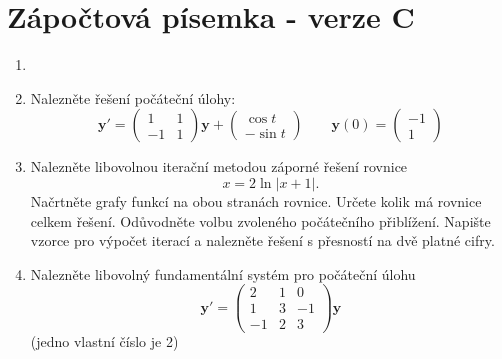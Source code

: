 \documentclass[a4paper,10pt]{article}
\def\vc#1{\mathbf{\boldsymbol{#1}}}     %
\def\abs#1{\lvert#1\rvert}
\begin{document}
\section*{Zápočtová písemka - verze C}
\begin{enumerate}
 \item 
 \item 
   Nalezněte řešení počáteční úlohy:
   \[
    \vc y'=\begin{pmatrix}
          1 & 1 \\ -1 & 1
       \end{pmatrix} \vc y
       +
       \begin{pmatrix}
         \cos t \\ -\sin t
       \end{pmatrix}
    \qquad
    \vc y(0)=\begin{pmatrix}
           -1 \\ 1
         \end{pmatrix}
   \]
\item 
    Nalezněte libovolnou iterační metodou záporné řešení rovnice
    \[
       x=2\ln\abs{x+1}.
    \]
    Načrtněte grafy funkcí na obou stranách rovnice. Určete kolik má rovnice celkem řešení.
    Odůvodněte volbu zvoleného počátečního přiblížení. Napište vzorce pro výpočet iterací
    a nalezněte řešení s přesností na dvě platné cifry.
 \item
    Nalezněte libovolný fundamentální systém pro počáteční úlohu
    \[
    \vc y'=\begin{pmatrix}
          2 & 1 & 0 \\ 
          1 & 3 & -1 \\
          -1 & 2 & 3
       \end{pmatrix} \vc y   
    \]
   (jedno vlastní číslo je 2)
\end{enumerate}

\pagebreak
\end{document}
